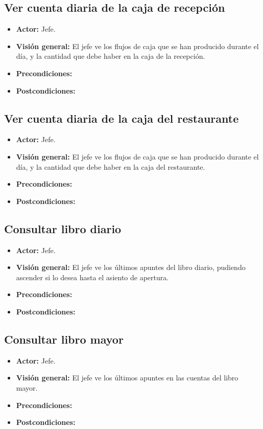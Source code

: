 \documentclass[spanish,a4paper,11pt, twoside]{report}	%
\begin{document}
	\subsection{Ver cuenta diaria de la caja de recepción}
		\begin{itemize}
			\item \textbf{Actor:} Jefe.
			\item \textbf{Visión general:} El jefe ve los flujos de caja que se han producido durante el día, y la cantidad que debe haber en la caja de la recepción.	
			\item \textbf{Precondiciones:} 
			\item \textbf{Postcondiciones:} 
		\end {itemize}


	\subsection{Ver cuenta diaria de la caja del restaurante}
		\begin{itemize}
			\item \textbf{Actor:} Jefe.
			\item \textbf{Visión general:} El jefe ve los flujos de caja que se han producido durante el día, y la cantidad que debe haber en la caja del restaurante.	
			\item \textbf{Precondiciones:} 
			\item \textbf{Postcondiciones:} 
		\end {itemize}


	\subsection{Consultar libro diario}
		\begin{itemize}
			\item \textbf{Actor:} Jefe.
			\item \textbf{Visión general:} El jefe ve los últimos apuntes del libro diario, pudiendo ascender si lo desea hasta el asiento de apertura.	
			\item \textbf{Precondiciones:} 
			\item \textbf{Postcondiciones:} 
		\end {itemize}


	\subsection{Consultar libro mayor}
		\begin{itemize}
			\item \textbf{Actor:} Jefe.
			\item \textbf{Visión general:} El jefe ve los últimos apuntes en las cuentas del libro mayor. 
			\item \textbf{Precondiciones:} 
			\item \textbf{Postcondiciones:} 
		\end {itemize}
\end{document}
